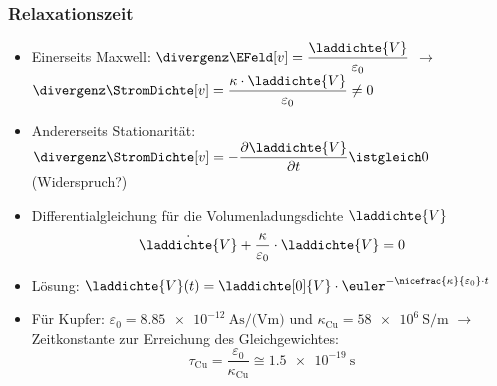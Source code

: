 \begin{frame}
  \frametitle{Relaxationszeit}

\begin{itemize}[<+->]      
\item Einerseits Maxwell: $\divergenz \EFeld[v] = \dfrac{\laddichte{V}}{\varepsilon_0}$ $\to$
$\divergenz \StromDichte[v] = \dfrac{\kappa \cdot \laddichte{V}}{\varepsilon_0} \neq 0$
\item Andererseits Stationarität: $\divergenz \StromDichte[v] = -\dfrac{\partial \laddichte{V}}{\partial t} \istgleich 0$ (Widerspruch?)
\item Differentialgleichung für die Volumenladungsdichte \(\laddichte{V} \)
\begin{equation*}
	\dot{\laddichte{V}} + \dfrac{\kappa}{\varepsilon_0} \cdot \laddichte{V} = 0
\end{equation*}
\item Lösung: 
$\laddichte{V}(t) = \laddichte[0]{V} \cdot \euler^{-\nicefrac{\kappa}{\varepsilon_0} \cdot t}$

\item Für Kupfer: \(\varepsilon_0 = \SI{8,85e-12}{\ampere\second\per(\volt\metre)} \) und \(\kappa_\mathrm{Cu} = \SI{58e6}{\siemens\per\metre} \) $\to$ Zeitkonstante zur Erreichung des Gleichgewichtes:
\begin{equation*}
	\tau_\mathrm{Cu} = \dfrac{\varepsilon_0}{\kappa_\mathrm{Cu}} \cong \SI{1,5e-19}{\second}
\end{equation*}
\end{itemize}
 \end{frame}

